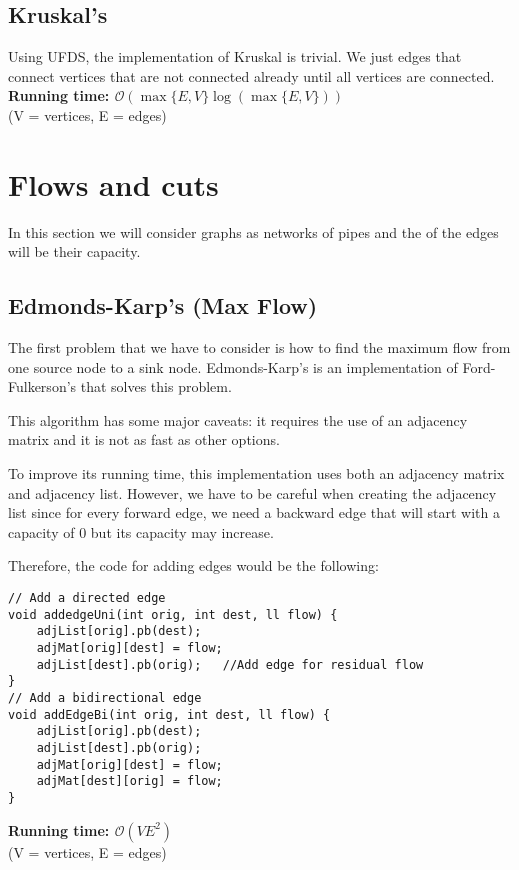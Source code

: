 \documentclass[12pt]{report}
\begin{document}
\subsection{Kruskal's}
Using UFDS, the implementation of Kruskal is trivial. We just edges that connect 
vertices that are not connected already until all vertices are connected.
\noindent \textbf{\boldmath Running time: $\mathcal{O}(\max\{E,V\}\log(\max\{E,V\}) )$}
\\ {\small (V = vertices, E = edges)}

\newpage
\section{Flows and cuts}
In this section we will consider graphs as networks of pipes and the 
of the edges will be their capacity.

\subsection{Edmonds-Karp's (Max Flow)}
The first problem that we have to consider is how to find the maximum flow from one
source node to a sink node. Edmonds-Karp's is an implementation of Ford-Fulkerson's 
that solves this problem.

This algorithm has some major caveats: it requires the use of an adjacency matrix
and it is not as fast as other options.

To improve its running time, this implementation uses both an adjacency matrix 
and adjacency list. However, we have to be careful when creating the adjacency
list since for every forward edge, we need a backward edge that will start with 
a capacity of 0 but its capacity may increase. 

Therefore, the code for adding edges would be the following:
\begin{verbatim}
// Add a directed edge
void addedgeUni(int orig, int dest, ll flow) {
    adjList[orig].pb(dest);
    adjMat[orig][dest] = flow;
    adjList[dest].pb(orig);   //Add edge for residual flow
}
// Add a bidirectional edge
void addEdgeBi(int orig, int dest, ll flow) {
    adjList[orig].pb(dest);
    adjList[dest].pb(orig);
    adjMat[orig][dest] = flow;
    adjMat[dest][orig] = flow;
}
\end{verbatim}
\newpage
{}
\noindent \textbf{\boldmath Running time: $\mathcal{O}(VE^2)$}
\\ {\small (V = vertices, E = edges)}
\end{document}
